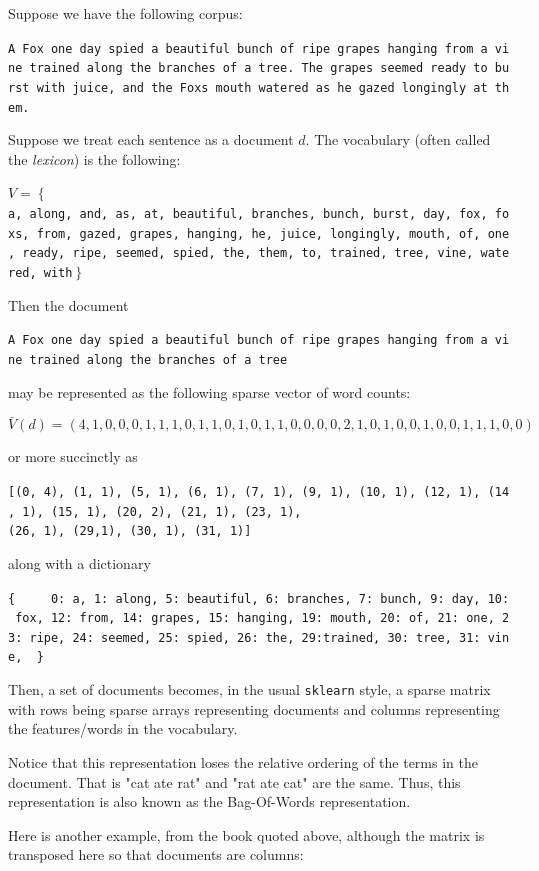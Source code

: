 \documentclass[11pt]{article}
\begin{document}
Suppose we have the following corpus:

\texttt{A\ Fox\ one\ day\ spied\ a\ beautiful\ bunch\ of\ ripe\ grapes\ hanging\ from\ a\ vine\ trained\ along\ the\ branches\ of\ a\ tree.\ The\ grapes\ seemed\ ready\ to\ burst\ with\ juice,\ and\ the\ Fox\textquotesingle{}s\ mouth\ watered\ as\ he\ gazed\ longingly\ at\ them.}

Suppose we treat each sentence as a document \(d\). The vocabulary
(often called the \emph{lexicon}) is the following:

\(V = \left\{\right.\)
\texttt{a,\ along,\ and,\ as,\ at,\ beautiful,\ branches,\ bunch,\ burst,\ day,\ fox,\ fox\textquotesingle{}s,\ from,\ gazed,\ grapes,\ hanging,\ he,\ juice,\ longingly,\ mouth,\ of,\ one,\ ready,\ ripe,\ seemed,\ spied,\ the,\ them,\ to,\ trained,\ tree,\ vine,\ watered,\ with}\(\left.\right\}\)

Then the document

\texttt{A\ Fox\ one\ day\ spied\ a\ beautiful\ bunch\ of\ ripe\ grapes\ hanging\ from\ a\ vine\ trained\ along\ the\ branches\ of\ a\ tree}

may be represented as the following sparse vector of word counts:

\[\bar V(d) = \left( 4,1,0,0,0,1,1,1,0,1,1,0,1,0,1,1,0,0,0,0,2,1,0,1,0,0,1,0,0,1,1,1,0,0 \right)\]

or more succinctly as

\texttt{{[}(0,\ 4),\ (1,\ 1),\ (5,\ 1),\ (6,\ 1),\ (7,\ 1),\ (9,\ 1),\ (10,\ 1),\ (12,\ 1),\ (14,\ 1),\ (15,\ 1),\ (20,\ 2),\ (21,\ 1),\ (23,\ 1),}
\texttt{(26,\ 1),\ (29,1),\ (30,\ 1),\ (31,\ 1){]}}

along with a dictionary

\texttt{\{\ \ \ \ \ 0:\ a,\ 1:\ along,\ 5:\ beautiful,\ 6:\ branches,\ 7:\ bunch,\ 9:\ day,\ 10:\ fox,\ 12:\ from,\ 14:\ grapes,\ 15:\ hanging,\ 19:\ mouth,\ 20:\ of,\ 21:\ one,\ 23:\ ripe,\ 24:\ seemed,\ 25:\ spied,\ 26:\ the,\ 29:trained,\ 30:\ tree,\ 31:\ vine,\ \ \}}

Then, a set of documents becomes, in the usual \texttt{sklearn} style, a
sparse matrix with rows being sparse arrays representing documents and
columns representing the features/words in the vocabulary.

Notice that this representation loses the relative ordering of the terms
in the document. That is "cat ate rat" and "rat ate cat" are the same.
Thus, this representation is also known as the Bag-Of-Words
representation.

Here is another example, from the book quoted above, although the matrix
is transposed here so that documents are columns:
\end{document}
